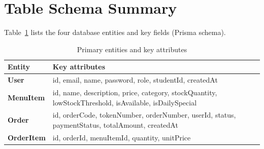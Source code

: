 \section{Table Schema Summary}
Table~\ref{tab:entities} lists the four database entities and key fields (Prisma schema).

\begin{table}[H]
  \centering
  \caption{Primary entities and key attributes}
  \label{tab:entities}
  \scriptsize
  \setlength{\tabcolsep}{4pt}
  \renewcommand{\arraystretch}{1.12}
  \begin{tabularx}{0.88\textwidth}{@{}>{\bfseries}p{} >{\raggedright\arraybackslash}X@{}}
    \toprule
    Entity & Key attributes \\
    \midrule
    User & id, email, name, password, role, studentId, createdAt \\
    MenuItem & id, name, description, price, category, stockQuantity, lowStockThreshold, isAvailable, isDailySpecial \\
    Order & id, orderCode, tokenNumber, orderNumber, userId, status, paymentStatus, totalAmount, createdAt \\
    OrderItem & id, orderId, menuItemId, quantity, unitPrice \\
    \bottomrule
  \end{tabularx}
\end{table}
